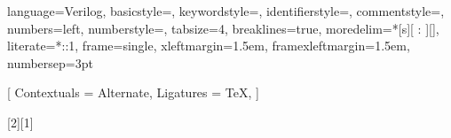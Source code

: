 \usepackage{listings}
\usepackage{fontspec}
\usepackage{xcolor}



\makeatletter
\newcommand*\@lbracket{[}
\newcommand*\@rbracket{]}
\newcommand*\@colon{:}
\newcommand*\colorIndex{%
    \edef\@temp{\the\lst@token}%
    \ifx\@temp\@lbracket \color{black}%
    \else\ifx\@temp\@rbracket \color{black}%
    \else\ifx\@temp\@colon \color{black}%
    \else \color{vorange}%
    \fi\fi\fi
}
\makeatother

{
    language=Verilog,
    basicstyle=\fontsize{6}{8}\selectfont\ttfamily,
    keywordstyle=\color{vblue},
    identifierstyle=\color{black},
    commentstyle=\color{vgreen},
    numbers=left,
    numberstyle=\tiny\color{mygray},
    tabsize=4,
    breaklines=true,
    moredelim=*[s][\colorIndex]{[}{]},
    literate=*{:}{:}1,
    frame=single,
    xleftmargin=1.5em, %
    framexleftmargin=1.5em,
    numbersep=3pt
}

\setmonofont{JetBrains Mono}[
    Contextuals = Alternate,
    Ligatures = TeX,
]
\lstset{
    basicstyle = \ttfamily,
    columns = flexible,
}

[2][1]
{
    \lstset{
        language=verilog,
        style=verilog,
        numbers=left,
        caption=#2,
        firstnumber=#1 %
    }
} {}

\newcommand{\codeword}[1]{\texttt{\footnotesize{#1}}}